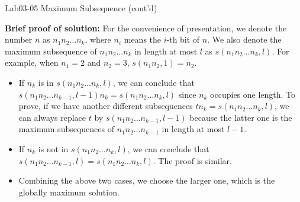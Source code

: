 \documentclass[aspectratio=169]{beamer}
\begin{document}
\begin{frame}{Lab03-05 Maximum Subsequence (cont'd)}

\vspace{-3mm}

    \textbf{Brief proof of solution:} For the convenience of presentation, we denote the number $n$ as $n_1n_2\dots n_k$, where $n_i$ means the $i$-th bit of $n$. We also denote the maximum subsequence of $n_1n_2\dots n_k$ in length at most $l$ as $s(n_1n_2\dots n_k, l)$. For example, when $n_1=2$ and $n_2=3$, $s(n_1n_2, 1)=n_2$.
    
    \begin{itemize}
        \item If $n_k$ is in $s(n_1n_2\dots n_k, l)$, we can conclude that $s(n_1n_2\dots n_{k-1}, l-1)n_k=s(n_1n_2\dots n_k, l)$ since $n_k$ occupies one length. To prove, if we have another different subsequences $tn_k=s(n_1n_2\dots n_k, l)$, we can always replace $t$ by $s(n_1n_2\dots n_{k-1}, l-1)$ because the latter one is the maximum subsequences of $n_1n_2\dots n_{k-1}$ in length at most $l-1$.
        \item If $n_k$ is not in $s(n_1n_2\dots n_k, l)$, we can conclude that $s(n_1n_2\dots n_{k-1}, l)=s(n_1n_2\dots n_k, l)$. The proof is similar.
        \item Combining the above two cases, we choose the larger one, which is the globally maximum solution.
        
    \end{itemize}
    
\end{frame}
\end{document}
